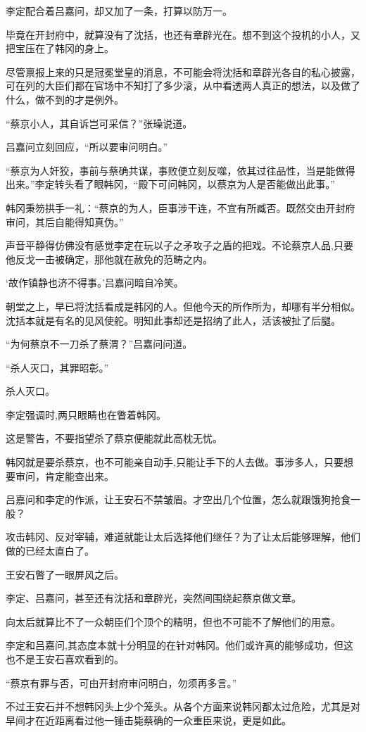 李定配合着吕嘉问，却又加了一条，打算以防万一。

毕竟在开封府中，就算没有了沈括，也还有章辟光在。想不到这个投机的小人，又把宝压在了韩冈的身上。

尽管禀报上来的只是冠冕堂皇的消息，不可能会将沈括和章辟光各自的私心披露，可在列的大臣们都在官场中不知打了多少滚，从中看透两人真正的想法，以及做了什么，做不到的才是例外。

“蔡京小人，其自诉岂可采信？”张璪说道。

吕嘉问立刻回应，“所以要审问明白。”

“蔡京为人奸狡，事前与蔡确共谋，事败便立刻反噬，依其过往品性，当是能做得出来。”李定转头看了眼韩冈，“殿下可问韩冈，以蔡京为人是否能做出此事。”

韩冈秉笏拱手一礼：“蔡京的为人，臣事涉干连，不宜有所臧否。既然交由开封府审问，其后自能得知真伪。”

声音平静得仿佛没有感觉李定在玩以子之矛攻子之盾的把戏。不论蔡京人品,只要他反戈一击被确定，那他就在赦免的范畴之内。

‘故作镇静也济不得事。’吕嘉问暗自冷笑。

朝堂之上，早已将沈括看成是韩冈的人。但他今天的所作所为，却哪有半分相似。沈括本就是有名的见风使舵。明知此事却还是招纳了此人，活该被扯了后腿。

“为何蔡京不一刀杀了蔡渭？”吕嘉问问道。

“杀人灭口，其罪昭彰。”

杀人灭口。

李定强调时,两只眼睛也在瞥着韩冈。

这是警告，不要指望杀了蔡京便能就此高枕无忧。

韩冈就是要杀蔡京，也不可能亲自动手,只能让手下的人去做。事涉多人，只要想要审问，肯定能查出来。

吕嘉问和李定的作派，让王安石不禁皱眉。才空出几个位置，怎么就跟饿狗抢食一般？

攻击韩冈、反对宰辅，难道就能让太后选择他们继任？为了让太后能够理解，他们做的已经太直白了。

王安石瞥了一眼屏风之后。

李定、吕嘉问，甚至还有沈括和章辟光，突然间围绕起蔡京做文章。

向太后就算比不了一众朝臣们个顶个的精明，但也不可能不了解他们的用意。

李定和吕嘉问,其态度本就十分明显的在针对韩冈。他们或许真的能够成功，但这也不是王安石喜欢看到的。

“蔡京有罪与否，可由开封府审问明白，勿须再多言。”

不过王安石并不想韩冈头上少个笼头。从各个方面来说韩冈都太过危险，尤其是对早间才在近距离看过他一锤击毙蔡确的一众重臣来说，更是如此。


